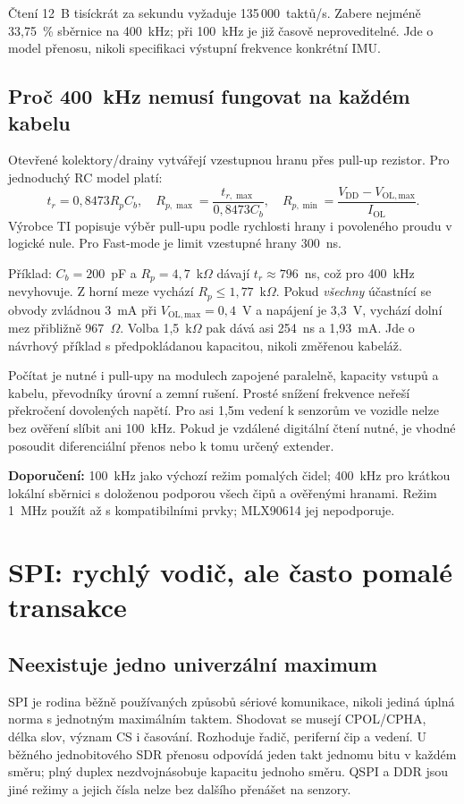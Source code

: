 \documentclass[11pt,a4paper]{article}
\begin{document}
Čtení 12~B tisíckrát za sekundu vyžaduje 135\,000~taktů/s. Zabere nejméně 33,75~\% sběrnice na 400~kHz; při 100~kHz je již časově neproveditelné. Jde o model přenosu, nikoli specifikaci výstupní frekvence konkrétní IMU.

\subsection{Proč 400~kHz nemusí fungovat na každém kabelu}
Otevřené kolektory/drainy vytvářejí vzestupnou hranu přes pull-up rezistor. Pro jednoduchý RC model platí:
\begin{equation}
t_r=0{,}8473R_pC_b,\quad
R_{p,\max}=\frac{t_{r,\max}}{0{,}8473C_b},\quad
R_{p,\min}=\frac{V_{\mathrm{DD}}-V_{\mathrm{OL,max}}}{I_{\mathrm{OL}}}.
\label{eq:pullup}
\end{equation}
Výrobce TI popisuje výběr pull-upu podle rychlosti hrany i povoleného proudu v logické nule.\cite{pullup} Pro Fast-mode je limit vzestupné hrany 300~ns.\cite{i2c}

Příklad: $C_b=200$~pF a $R_p=4{,}7$~k$\Omega$ dávají $t_r\approx796$~ns, což pro 400~kHz nevyhovuje. Z horní meze vychází $R_p\le1{,}77$~k$\Omega$. Pokud \emph{všechny} účastnící se obvody zvládnou 3~mA při $V_{\mathrm{OL,max}}=0{,}4$~V a napájení je 3,3~V, vychází dolní mez přibližně 967~$\Omega$. Volba 1,5~k$\Omega$ pak dává asi 254~ns a 1,93~mA. Jde o návrhový příklad s předpokládanou kapacitou, nikoli změřenou kabeláž.

Počítat je nutné i pull-upy na modulech zapojené paralelně, kapacity vstupů a kabelu, převodníky úrovní a zemní rušení. Prosté snížení frekvence neřeší překročení dovolených napětí. Pro asi 1,5m vedení k senzorům ve vozidle nelze bez ověření slíbit ani 100~kHz. Pokud je vzdálené digitální čtení nutné, je vhodné posoudit diferenciální přenos nebo k tomu určený extender.

\textbf{Doporučení:} 100~kHz jako výchozí režim pomalých čidel; 400~kHz pro krátkou lokální sběrnici s doloženou podporou všech čipů a ověřenými hranami. Režim 1~MHz použít až s kompatibilními prvky; MLX90614 jej nepodporuje.

\section{SPI: rychlý vodič, ale často pomalé transakce}
\subsection{Neexistuje jedno univerzální maximum}
SPI je rodina běžně používaných způsobů sériové komunikace, nikoli jediná úplná norma s jednotným maximálním taktem. Shodovat se musejí CPOL/CPHA, délka slov, význam CS i časování. Rozhoduje řadič, periferní čip a vedení.\cite{spiadi} U běžného jednobitového SDR přenosu odpovídá jeden takt jednomu bitu v každém směru; plný duplex nezdvojnásobuje kapacitu jednoho směru. QSPI a DDR jsou jiné režimy a jejich čísla nelze bez dalšího přenášet na senzory.
\end{document}
